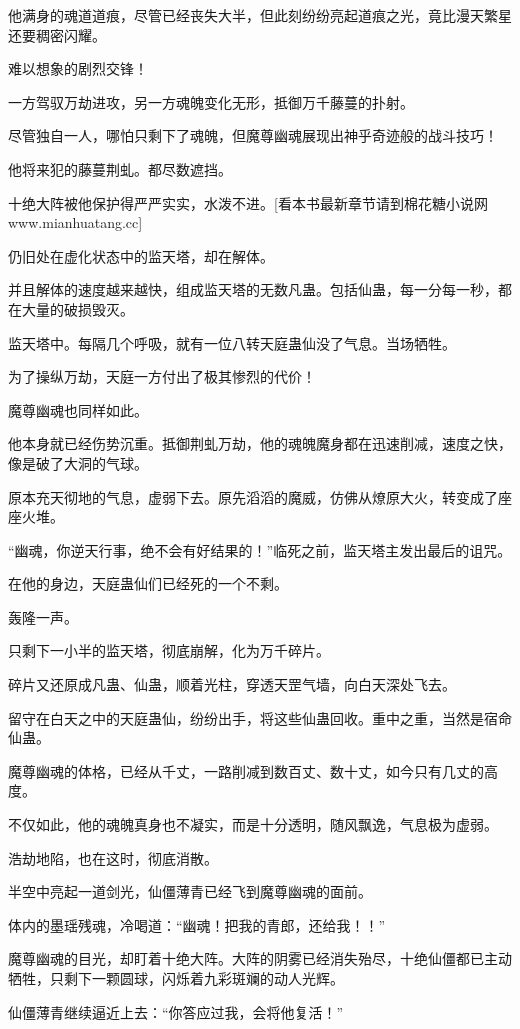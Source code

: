 \begin{this_body}
他满身的魂道道痕，尽管已经丧失大半，但此刻纷纷亮起道痕之光，竟比漫天繁星还要稠密闪耀。

难以想象的剧烈交锋！

一方驾驭万劫进攻，另一方魂魄变化无形，抵御万千藤蔓的扑射。

尽管独自一人，哪怕只剩下了魂魄，但魔尊幽魂展现出神乎奇迹般的战斗技巧！

他将来犯的藤蔓荆虬。都尽数遮挡。

十绝大阵被他保护得严严实实，水泼不进。[看本书最新章节请到棉花糖小说网www.mianhuatang.cc]

仍旧处在虚化状态中的监天塔，却在解体。

并且解体的速度越来越快，组成监天塔的无数凡蛊。包括仙蛊，每一分每一秒，都在大量的破损毁灭。

监天塔中。每隔几个呼吸，就有一位八转天庭蛊仙没了气息。当场牺牲。

为了操纵万劫，天庭一方付出了极其惨烈的代价！

魔尊幽魂也同样如此。

他本身就已经伤势沉重。抵御荆虬万劫，他的魂魄魔身都在迅速削减，速度之快，像是破了大洞的气球。

原本充天彻地的气息，虚弱下去。原先滔滔的魔威，仿佛从燎原大火，转变成了座座火堆。

“幽魂，你逆天行事，绝不会有好结果的！”临死之前，监天塔主发出最后的诅咒。

在他的身边，天庭蛊仙们已经死的一个不剩。

轰隆一声。

只剩下一小半的监天塔，彻底崩解，化为万千碎片。

碎片又还原成凡蛊、仙蛊，顺着光柱，穿透天罡气墙，向白天深处飞去。

留守在白天之中的天庭蛊仙，纷纷出手，将这些仙蛊回收。重中之重，当然是宿命仙蛊。

魔尊幽魂的体格，已经从千丈，一路削减到数百丈、数十丈，如今只有几丈的高度。

不仅如此，他的魂魄真身也不凝实，而是十分透明，随风飘逸，气息极为虚弱。

浩劫地陷，也在这时，彻底消散。

半空中亮起一道剑光，仙僵薄青已经飞到魔尊幽魂的面前。

体内的墨瑶残魂，冷喝道：“幽魂！把我的青郎，还给我！！”

魔尊幽魂的目光，却盯着十绝大阵。大阵的阴雾已经消失殆尽，十绝仙僵都已主动牺牲，只剩下一颗圆球，闪烁着九彩斑斓的动人光辉。

仙僵薄青继续逼近上去：“你答应过我，会将他复活！”


\end{this_body}
